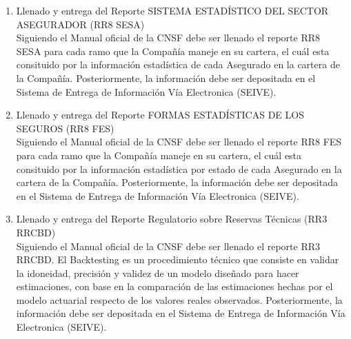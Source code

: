 \documentclass[11pt,twoside,openright,spanish]{report}
\numberwithin{equation}{chapter}
\numberwithin{figure}{chapter}
\numberwithin{table}{chapter}
\begin{document}
\begin{singlespace}
\begin{enumerate}
\begin{enumerate}
\begin{enumerate}
				\item {Llenado y entrega del Reporte SISTEMA ESTADÍSTICO DEL SECTOR ASEGURADOR (RR8 SESA)} \\ \-\hspace{0.5cm}
				Siguiendo el Manual oficial de la CNSF debe ser llenado el reporte RR8 SESA para cada ramo que la Compañía maneje en su cartera, el cuál esta consituido por la información estadística de cada Asegurado en la cartera de la Compañía. Posteriormente, la información debe ser depositada en el Sistema de Entrega de Información Vía Electronica (SEIVE).
				\item {Llenado y entrega del Reporte FORMAS ESTADÍSTICAS DE LOS SEGUROS (RR8 FES)} \\ \-\hspace{0.5cm}
				Siguiendo el Manual oficial de la CNSF debe ser llenado el reporte RR8 FES para cada ramo que la Compañía maneje en su cartera, el cuál esta consituido por la información estadística por estado de cada Asegurado en la cartera de la Compañía. Posteriormente, la información debe ser depositada en el Sistema de Entrega de Información Vía Electronica (SEIVE).
					\item {Llenado y entrega del Reporte Regulatorio sobre Reservas Técnicas (RR3 RRCBD)} \\ \-\hspace{0.5cm}
				Siguiendo el Manual oficial de la CNSF debe ser llenado el reporte RR3 RRCBD. El Backtesting es un procedimiento técnico que consiste en validar la idoneidad, precisión y validez de un modelo diseñado para hacer estimaciones, con base en la comparación de las estimaciones hechas por el modelo actuarial respecto de los valores reales observados. Posteriormente, la información debe ser depositada en el Sistema de Entrega de Información Vía Electronica (SEIVE).
			\end{enumerate}
		

\end{enumerate}
\end{enumerate}
\end{singlespace}
\end{document}
